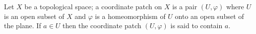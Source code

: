 Let $X$ be a topological space; a coordinate patch on $X$ is a pair $(U, \varphi)$ where $U$ is an open subset of $X$ and $\varphi$ is a homeomorphism of $U$ onto an open subset of the plane. If $a \in U$ then the coordinate patch $(U, \varphi)$ is said to contain $a$.